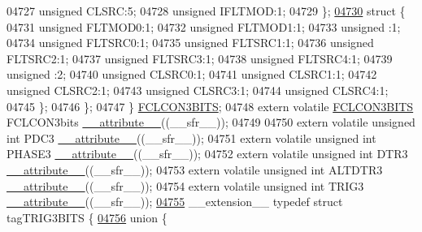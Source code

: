 \begin{DoxyCode}
04727       \textcolor{keywordtype}{unsigned} CLSRC:5;
04728       \textcolor{keywordtype}{unsigned} IFLTMOD:1;
04729     \};
\hypertarget{a00009_source_l04730}{}\hyperlink{a00009}{04730}     \textcolor{keyword}{struct }\{
04731       \textcolor{keywordtype}{unsigned} FLTMOD0:1;
04732       \textcolor{keywordtype}{unsigned} FLTMOD1:1;
04733       \textcolor{keywordtype}{unsigned} :1;
04734       \textcolor{keywordtype}{unsigned} FLTSRC0:1;
04735       \textcolor{keywordtype}{unsigned} FLTSRC1:1;
04736       \textcolor{keywordtype}{unsigned} FLTSRC2:1;
04737       \textcolor{keywordtype}{unsigned} FLTSRC3:1;
04738       \textcolor{keywordtype}{unsigned} FLTSRC4:1;
04739       \textcolor{keywordtype}{unsigned} :2;
04740       \textcolor{keywordtype}{unsigned} CLSRC0:1;
04741       \textcolor{keywordtype}{unsigned} CLSRC1:1;
04742       \textcolor{keywordtype}{unsigned} CLSRC2:1;
04743       \textcolor{keywordtype}{unsigned} CLSRC3:1;
04744       \textcolor{keywordtype}{unsigned} CLSRC4:1;
04745     \};
04746   \};
04747 \} \hyperlink{a00008_d0/dc4/a00443}{FCLCON3BITS};
04748 \textcolor{keyword}{extern} \textcolor{keyword}{volatile} \hyperlink{a00008_d0/dc4/a00443}{FCLCON3BITS} FCLCON3bits \hyperlink{a00009_a493c46f03454991ccc5aa7a6e1dfb2a7}{\_\_attribute\_\_}((\_\_sfr\_\_));
04749 
04750 \textcolor{keyword}{extern} \textcolor{keyword}{volatile} \textcolor{keywordtype}{unsigned} \textcolor{keywordtype}{int}  PDC3 \hyperlink{a00009_a493c46f03454991ccc5aa7a6e1dfb2a7}{\_\_attribute\_\_}((\_\_sfr\_\_));
04751 \textcolor{keyword}{extern} \textcolor{keyword}{volatile} \textcolor{keywordtype}{unsigned} \textcolor{keywordtype}{int}  PHASE3 \hyperlink{a00009_a493c46f03454991ccc5aa7a6e1dfb2a7}{\_\_attribute\_\_}((\_\_sfr\_\_));
04752 \textcolor{keyword}{extern} \textcolor{keyword}{volatile} \textcolor{keywordtype}{unsigned} \textcolor{keywordtype}{int}  DTR3 \hyperlink{a00009_a493c46f03454991ccc5aa7a6e1dfb2a7}{\_\_attribute\_\_}((\_\_sfr\_\_));
04753 \textcolor{keyword}{extern} \textcolor{keyword}{volatile} \textcolor{keywordtype}{unsigned} \textcolor{keywordtype}{int}  ALTDTR3 \hyperlink{a00009_a493c46f03454991ccc5aa7a6e1dfb2a7}{\_\_attribute\_\_}((\_\_sfr\_\_));
04754 \textcolor{keyword}{extern} \textcolor{keyword}{volatile} \textcolor{keywordtype}{unsigned} \textcolor{keywordtype}{int}  TRIG3 \hyperlink{a00009_a493c46f03454991ccc5aa7a6e1dfb2a7}{\_\_attribute\_\_}((\_\_sfr\_\_));
\hypertarget{a00009_source_l04755}{}\hyperlink{a00008}{04755} \_\_extension\_\_ \textcolor{keyword}{typedef} \textcolor{keyword}{struct }tagTRIG3BITS \{
\hypertarget{a00009_source_l04756}{}\hyperlink{a00009}{04756}   \textcolor{keyword}{union }\{

\end{DoxyCode}
